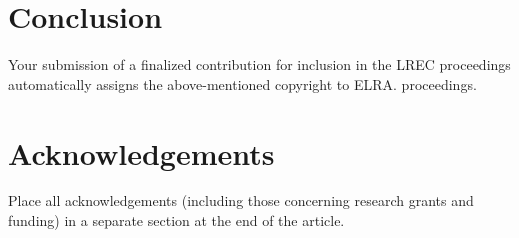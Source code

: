 \documentclass[10pt, a4paper]{article}
\begin{document}
\section{Conclusion}

Your submission of a finalized contribution for inclusion in the LREC proceedings automatically assigns the above-mentioned copyright to ELRA.
proceedings.

\section{Acknowledgements}

Place all acknowledgements (including those concerning research grants and funding) in a separate section at the end of the article.




\end{document}
